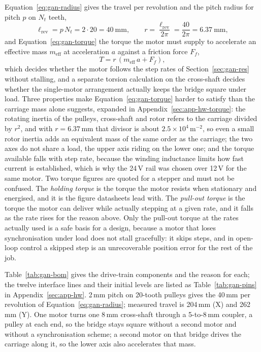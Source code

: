 Equation~\ref{eq:gan-radius} gives the travel per revolution and the pitch radius for pitch $p$ on $N_t$ teeth,
\begin{equation}
\ell_{\mathrm{rev}}=p\,N_t=2\cdot20=40\ \mathrm{mm},\qquad r=\frac{\ell_{\mathrm{rev}}}{2\pi}=\frac{40}{2\pi}=6.37\ \mathrm{mm},
\label{eq:gan-radius}
\end{equation}
and Equation~\ref{eq:gan-torque} the torque the motor must supply to accelerate an effective mass $m_{\mathrm{eff}}$ at acceleration $a$ against a friction force $F_f$,
\begin{equation}
T=r\,(m_{\mathrm{eff}}\,a+F_f),
\label{eq:gan-torque}
\end{equation}
which decides whether the motor follows the step rates of Section~\ref{sec:gan-res} without stalling, and a separate torsion calculation on the cross-shaft decides whether the single-motor arrangement actually keeps the bridge square under load.
Three properties make Equation~\ref{eq:gan-torque} harder to satisfy than the carriage mass alone suggests, expanded in Appendix~\ref{sec:app-hw-torque}: the rotating inertia of the pulleys, cross-shaft and rotor refers to the carriage divided by $r^2$, and with $r=6.37$\,mm that divisor is about $2.5\times10^4$\,m$^{-2}$, so even a small rotor inertia adds an equivalent mass of the same order as the carriage; the two axes do not share a load, the upper axis riding on the lower one; and the torque available falls with step rate, because the winding inductance limits how fast current is established, which is why the 24\,V rail was chosen over 12\,V for the same motor.
Two torque figures are quoted for a stepper and must not be confused. The \emph{holding torque} is the torque the motor resists when stationary and energised, and it is the figure datasheets lead with. The \emph{pull-out torque} is the torque the motor can deliver while actually stepping at a given rate, and it falls as the rate rises for the reason above. Only the pull-out torque at the rates actually used is a safe basis for a design, because a motor that loses synchronisation under load does not stall gracefully: it skips steps, and in open-loop control a skipped step is an unrecoverable position error for the rest of the job.

Table~\ref{tab:gan-bom} gives the drive-train components and the reason for each; the twelve interface lines and their initial levels are listed as Table~\ref{tab:gan-pins} in Appendix~\ref{sec:app-hw}. 2\,mm pitch on 20-tooth pulleys gives the 40\,mm per revolution of Equation~\ref{eq:gan-radius}; measured travel is 204\,mm (X) and 262\,mm (Y). One motor turns one 8\,mm cross-shaft through a 5-to-8\,mm coupler, a pulley at each end, so the bridge stays square without a second motor and without a synchronisation scheme; a second motor on that bridge drives the carriage along it, so the lower axis also accelerates that mass.

